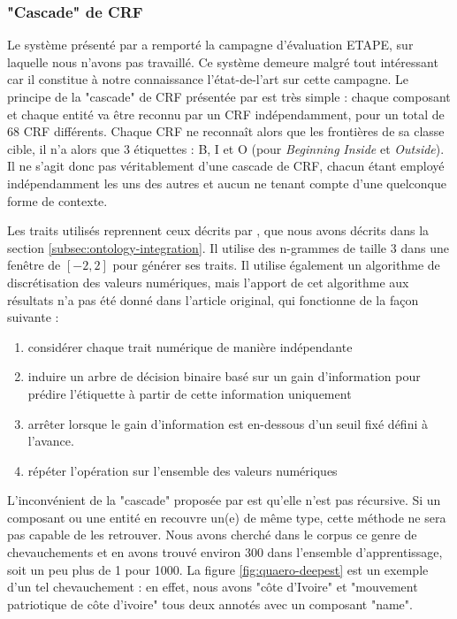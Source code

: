 \documentclass[12pt,a4paper,times,twoside,openright]{report}
\begin{document}
            \subsubsection{"Cascade" de CRF}
Le système présenté par \citet{raymond2013robust} a remporté la campagne d'évaluation ETAPE, sur laquelle nous n'avons pas travaillé. Ce système demeure malgré tout intéressant car il constitue à notre connaissance l'état-de-l'art sur cette campagne. Le principe de la "cascade" de CRF présentée par \citet{raymond2013robust} est très simple : chaque composant et chaque entité va être reconnu par un CRF indépendamment, pour un total de 68 CRF différents. Chaque CRF ne reconnaît alors que les frontières de sa classe cible, il n'a alors que 3 étiquettes : B, I et O (pour \textit{Beginning} \textit{Inside} et \textit{Outside}). Il ne s'agit donc pas véritablement d'une cascade de CRF, chacun étant employé indépendamment les uns des autres et aucun ne tenant compte d'une quelconque forme de contexte.

Les traits utilisés reprennent ceux décrits par \citet{raymond2010reconnaissance}, que nous avons décrits dans la section \ref{subsec:ontology-integration}. Il utilise des n-grammes de taille 3 dans une fenêtre de $[-2,2]$ pour générer ses traits. Il utilise également un algorithme de discrétisation des valeurs numériques, mais l'apport de cet algorithme aux résultats n'a pas été donné dans l'article original, qui fonctionne de la façon suivante :
\begin{enumerate}
    \item considérer chaque trait numérique de manière indépendante %
    \item induire un arbre de décision binaire basé sur un gain d'information pour prédire l'étiquette à partir de cette information uniquement %
    \item arrêter lorsque le gain d'information est en-dessous d'un seuil fixé défini à l'avance. %
    \item répéter l'opération sur l'ensemble des valeurs numériques %
\end{enumerate}

L'inconvénient de la "cascade" proposée par \citet{raymond2013robust} est qu'elle n'est pas récursive. Si un composant ou une entité en recouvre un(e) de même type, cette méthode ne sera pas capable de les retrouver. Nous avons cherché dans le corpus ce genre de chevauchements et en avons trouvé environ 300 dans l'ensemble d'apprentissage, soit un peu plus de 1 pour 1000. La figure \ref{fig:quaero-deepest} est un exemple d'un tel chevauchement : en effet, nous avons "côte d'Ivoire" et "mouvement patriotique de côte d'ivoire" tous deux annotés avec un composant "name".
\end{document}
